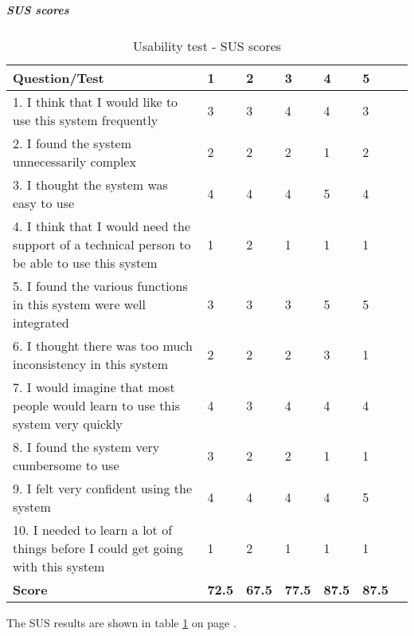 \subparagraph{SUS scores}\hfill
\newline
\begin{table}[h!]
\begin{center}
			\begin{tabular}{p{8cm}|l|l|l|l|l|l}	\hline
				\textbf{Question/Test}&\textbf{1}&\textbf{2}&\textbf{3}&\textbf{4}&\textbf{5}\\ \hline \hline
				1. I think that I would like to use this system frequently&3&3&4&4&3\\ \hline
				2. I found the system unnecessarily complex&2&2&2&1&2\\ \hline
				3. I thought the system was easy to use&4&4&4&5&4\\ \hline
				4. I think that I would need the support of a technical person to be able to use this system&1&2&1&1&1\\ \hline
				5. I found the various functions in this system were well integrated&3&3&3&5&5\\ \hline
				6. I thought there was too much inconsistency in this system&2&2&2&3&1\\ \hline
				7. I would imagine that most people would learn to use this system very quickly&4&3&4&4&4\\ \hline
				8. I found the system very cumbersome to use&3&2&2&1&1\\ \hline
				9. I felt very confident using the system&4&4&4&4&5\\ \hline
				10. I needed to learn a lot of things before I could get going with this system&1&2&1&1&1\\ \hline \hline
				\textbf{Score}&\textbf{72.5}&\textbf{67.5}&\textbf{77.5}&\textbf{87.5}&\textbf{87.5}\\ \hline 
				
\end{tabular}
\end{center}
\caption{Usability test - SUS scores} \label{tab:usabilitysusscore}
\end{table}
The SUS results are shown in table \ref{tab:usabilitysusscore} on page \pageref{tab:usabilitysusscore}.
\newline
\newline
			
\newpage

